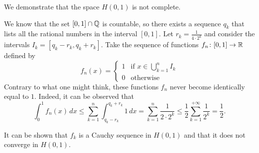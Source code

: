 \begin{example}
\label{ex:incompletezza_di_H}%
We demonstrate that the space $H(0,1)$ is not complete.

We know that the set $[0,1]\cap {\mathbb Q}$ is countable, so there exists a sequence
$q_k$ that lists all the rational numbers in the interval $[0,1]$. Let $r_k =
\frac{1}{4\cdot 2^k}$ and consider the intervals $I_k = [q_k-r_k,q_k+r_k]$. Take
the sequence of functions $f_n\colon [0,1]\to {\mathbb R}$ defined by
\[
  f_n(x) =
  \begin{cases}
  1 &\text{if } x\in\displaystyle\bigcup_{k=1}^{n} I_k\\
  0 & \text{otherwise}
  \end{cases}
\]
Contrary to what one might think, these functions $f_n$ never become identically
equal to $1$. Indeed, it can be observed that
\[
  \int_0^1 f_n(x)\, dx
  \le \sum_{k=1}^n \int_{q_k-r_k}^{q_k+r_k} 1\, dx
  = \sum_{k=1}^n \frac{1}{2\cdot 2^k}
  \le \frac{1}{2}\sum_{k=1}^{+\infty}\frac{1}{2^k} = \frac 1 2.
\]

It can be shown that $f_k$ is a Cauchy sequence in $H(0,1)$ and that it does not
converge in $H(0,1)$.
\end{example}

